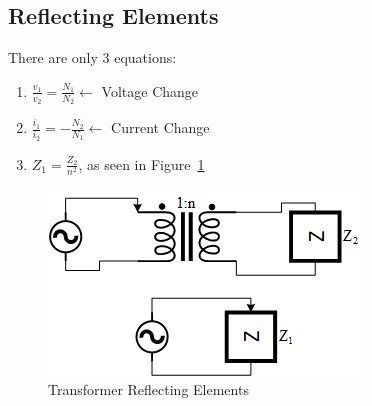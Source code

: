 \documentclass[10pt,letterpaper,final,twoside,notitlepage]{article}
\begin{document}
	\subsection*{Reflecting Elements} \label{subsec:Element Reflection}
		There are only 3 equations:
		\begin{enumerate}
			\item $\frac{v_{1}}{v_{2}} = \frac{N_{1}}{N_{2}} \longleftarrow$ Voltage Change
			\item $\frac{i_{1}}{i_{2}} = -\frac{N_{2}}{N_{1}} \longleftarrow$ Current Change
			\item $Z_{1} = \frac{Z_{2}}{n^{2}}$, as seen in Figure~\ref{fig:Transformer Reflecting}
		\end{enumerate}
		\begin{figure}[ht!]
			\centering
			\includegraphics[scale=0.5]{Transformer_Reflecting.png}
			\caption{Transformer Reflecting Elements}
			\label{fig:Transformer Reflecting}
		\end{figure} \vspace{-10mm}
	
\end{document}
